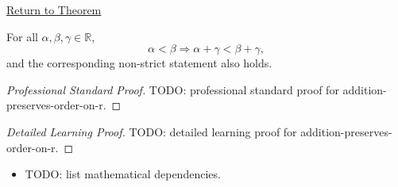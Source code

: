 \newpage
{}
\label{prf:addition-preserves-order-on-r}

\begin{remark*}[Return]
\hyperref[thm:addition-preserves-order-on-r]{Return to Theorem}
\end{remark*}

\begin{theorem*}
For all $\alpha,\beta,\gamma\in\mathbb{R}$,
\[
\alpha<\beta \Longrightarrow \alpha+\gamma<\beta+\gamma,
\]
and the corresponding non-strict statement also holds.
\end{theorem*}

\begin{proof}[Professional Standard Proof]
\LRAProofBodyStart
TODO: professional standard proof for addition-preserves-order-on-r.
\end{proof}

\begin{proof}[Detailed Learning Proof]
\LRAProofBodyStart
TODO: detailed learning proof for addition-preserves-order-on-r.
\end{proof}

\begin{remark*}
\end{remark*}

\begin{dependencies}
\begin{itemize}
  \item TODO: list mathematical dependencies.
\end{itemize}
\end{dependencies}

\clearpage
